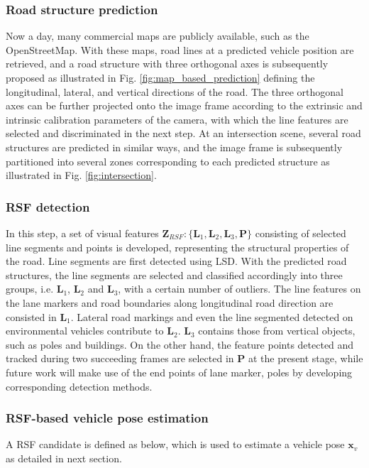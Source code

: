 \documentclass[letterpaper, 10 pt, conference]{ieeeconf}  %
\begin{document}
\subsubsection{Road structure prediction}
Now a day, many commercial maps are publicly available, such as the OpenStreetMap. With these maps, road lines at a predicted vehicle position are retrieved, and a road structure with three orthogonal axes is subsequently proposed as illustrated in Fig. \ref{fig:map_based_prediction} defining the longitudinal, lateral, and vertical directions of the road. The three orthogonal axes can be further projected onto the image frame according to the extrinsic and intrinsic calibration parameters of the camera, with which the line features are selected and discriminated in the next step. At an intersection scene, several road structures are predicted in similar ways, and the image frame is subsequently partitioned into several zones corresponding to each predicted structure as illustrated in Fig. \ref{fig:intersection}.

\subsubsection{RSF detection}
In this step, a set of visual features $\mathbf{Z}_{RSF}:\{\mathbf{L}_1,\mathbf{L}_2,\mathbf{L}_3,\mathbf{P}\}$ consisting of selected line segments and points is developed, representing the  structural properties of the road. Line segments are first detected using LSD\cite{von2012lsd}. With the predicted road structures, the line segments are selected and classified accordingly into three groups, i.e. $\mathbf{L}_1$, $\mathbf{L}_2$ and $\mathbf{L}_3$, with a certain number of outliers. The line features on the lane markers and road boundaries along longitudinal road direction are consisted in $\mathbf{L}_1$. Lateral road markings and even the line segmented detected on environmental vehicles contribute to $\mathbf{L}_2$. $\mathbf{L}_3$ contains those from vertical objects, such as poles and buildings. On the other hand, the feature points detected and tracked during two succeeding frames are selected in $\mathbf{P}$ at the present stage, while future work will make use of the end points of lane marker, poles by developing corresponding detection methods.

\subsubsection{RSF-based vehicle pose estimation}
A RSF candidate is defined as below, which is used to estimate a vehicle pose $\mathbf{x}_v$ as detailed in next section.
\end{document}
